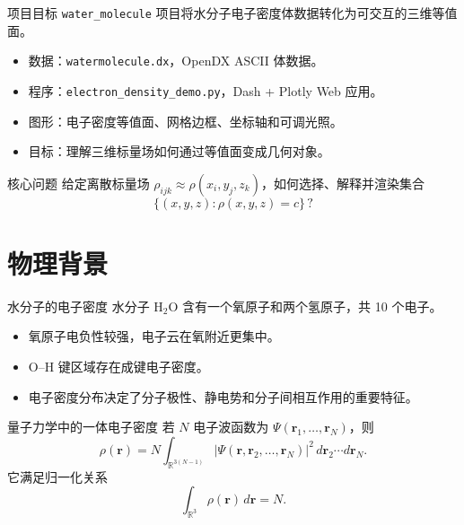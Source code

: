 \documentclass[aspectratio=169,11pt]{ctexbeamer}
\begin{document}
\begin{frame}{项目目标}
  \texttt{water\_molecule} 项目将水分子电子密度体数据转化为可交互的三维等值面。

  \begin{itemize}
    \item 数据：\texttt{watermolecule.dx}，OpenDX ASCII 体数据。
    \item 程序：\texttt{electron\_density\_demo.py}，Dash + Plotly Web 应用。
    \item 图形：电子密度等值面、网格边框、坐标轴和可调光照。
    \item 目标：理解三维标量场如何通过等值面变成几何对象。
  \end{itemize}

  \begin{block}{核心问题}
    给定离散标量场 $\rho_{ijk}\approx \rho(x_i,y_j,z_k)$，如何选择、解释并渲染集合
    \[
      \{(x,y,z): \rho(x,y,z)=c\}\, ?
    \]
  \end{block}
\end{frame}

\section{物理背景}

\begin{frame}{水分子的电子密度}
  水分子 H$_2$O 含有一个氧原子和两个氢原子，共 10 个电子。

  \begin{itemize}
    \item 氧原子电负性较强，电子云在氧附近更集中。
    \item O--H 键区域存在成键电子密度。
    \item 电子密度分布决定了分子极性、静电势和分子间相互作用的重要特征。
  \end{itemize}

  \begin{block}{量子力学中的一体电子密度}
    若 $N$ 电子波函数为 $\Psi(\mathbf r_1,\ldots,\mathbf r_N)$，则
    \[
      \rho(\mathbf r)
      =
      N\int_{\mathbb R^{3(N-1)}}
      |\Psi(\mathbf r,\mathbf r_2,\ldots,\mathbf r_N)|^2
      \,d\mathbf r_2\cdots d\mathbf r_N .
    \]
    它满足归一化关系
    \[
      \int_{\mathbb R^3}\rho(\mathbf r)\,d\mathbf r = N .
    \]
  \end{block}
\end{frame}
\end{document}
